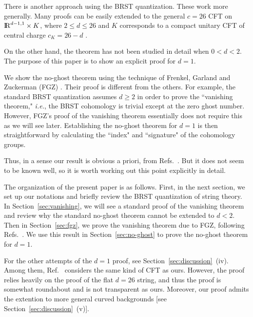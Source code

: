 \documentclass[a4paper,12pt]{article}
\def\IR{\relax{\rm I\kern-.18em R}}
\begin{document}
There is another approach using the BRST quantization. These work more
generally. Many proofs can be easily extended to the general $c=26$
CFT on $ \IR^{d-1,1} \times K $, where $2 \leq d \leq 26$ and $K$ corresponds to a compact unitary CFT of central charge $ c_{K} = 26-d $
\cite{KO,FGZ,spiegelglas,GM,Big}. 

On the other hand, the theorem has not been studied in detail when $0<d<2$. The
purpose of this paper is to show an explicit proof for $d=1$.

We show the no-ghost theorem using the technique of Frenkel, Garland and
Zuckerman (FGZ) \cite{FGZ}. Their proof is different from the others. For
example, the standard BRST quantization assumes $d \geq 2$ in order to prove
the ``vanishing theorem," {\it i.e.}, the BRST cohomology is trivial except
at the zero ghost number. However, 
FGZ's proof of the vanishing theorem essentially does not require this as we will see later.
Establishing the no-ghost theorem for $d=1$ is then
straightforward by calculating the ``index" and ``signature" of the cohomology groups.

Thus, in a sense our result is obvious a priori, from Refs.~\cite{FGZ,LZ,FK}.
But it does not seem to be known well, so it is worth working out this point
explicitly in detail.

The organization of the present paper is as follows. First, in the next
section, we set up our notations and briefly review the BRST quantization of
string theory. In Section~\ref{sec:vanishing}, we will see a
standard proof
of the vanishing theorem and review why the standard no-ghost theorem cannot
be extended to $d<2$. Then in Section~\ref{sec:fgz}, we prove the
vanishing theorem due to FGZ, following Refs.~\cite{FGZ,LZ,FK}.
We use this result in Section~\ref{sec:no-ghost} to prove the no-ghost
theorem for $d=1$.

For the other attempts of the $d=1$ proof, see Section~\ref{sec:discussion}~(iv). Among them, Ref.~\cite{GM} considers the same kind of CFT as ours. However, the proof relies heavily on the proof of the flat $d=26$ string, and thus the proof is somewhat roundabout and is not transparent as ours. Moreover, our proof admits the extention to more general curved backgrounds [see Section~\ref{sec:discussion}~(v)].
\end{document}
